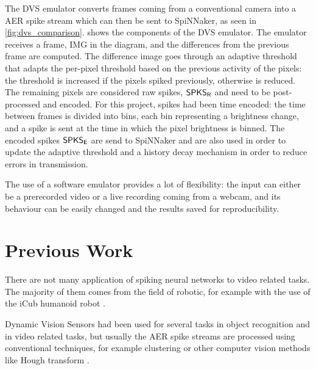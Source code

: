 The DVS emulator converts frames coming from a conventional camera into a AER spike stream which can then be sent to SpiNNaker, as seen in \cref{fig:dvs_comparison}.  
 shows the components of the DVS emulator. The emulator receives a frame, \textsf{IMG} in the diagram, and the differences from the previous frame are computed. The difference image goes through an adaptive threshold that adapts the per-pixel threshold based on the previous activity of the pixels: the threshold is increased if the pixels spiked previously, otherwise is reduced. The remaining pixels are considered raw spikes, $\text{\textsf{SPKS}}_\text{\textsf{R}}$ and need to be post-processed and encoded. For this project, spikes had been time encoded: the time between frames is divided into bins, each bin representing a brightness change, and a spike is sent at the time in which the pixel brightness is binned. The encoded spikes $\text{\textsf{SPKS}}_\text{\textsf{E}}$ are send to SpiNNaker and are also used in order to update the adaptive threshold and a history decay mechanism in order to reduce errors in transmission. 

The use of a software emulator provides a lot of flexibility: the input can either be a prerecorded video or a live recording coming from a webcam, and its behaviour can be easily changed and the results saved for reproducibility. 





\section{Previous Work}
There are not many application of spiking neural networks to video related tasks. The majority of them comes from the field of robotic, for example with the use of the iCub humanoid robot \cite{HernandezGarcia2018}.

Dynamic Vision Sensors had been used for several tasks in object recognition and in video related tasks, but usually the AER spike streams are processed using conventional techniques, for example clustering or other computer vision methods like Hough transform \cite{Glover2016, Glover2017}.